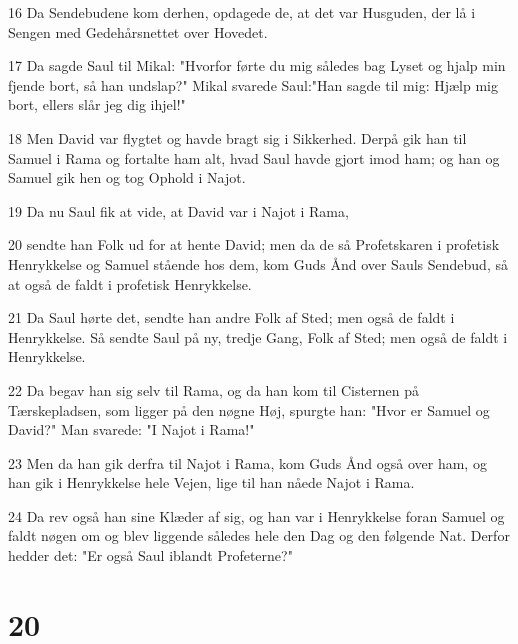\par 16 Da Sendebudene kom derhen, opdagede de, at det var Husguden, der lå i Sengen med Gedehårsnettet over Hovedet.
\par 17 Da sagde Saul til Mikal: "Hvorfor førte du mig således bag Lyset og hjalp min fjende bort, så han undslap?" Mikal svarede Saul:"Han sagde til mig: Hjælp mig bort, ellers slår jeg dig ihjel!"
\par 18 Men David var flygtet og havde bragt sig i Sikkerhed. Derpå gik han til Samuel i Rama og fortalte ham alt, hvad Saul havde gjort imod ham; og han og Samuel gik hen og tog Ophold i Najot.
\par 19 Da nu Saul fik at vide, at David var i Najot i Rama,
\par 20 sendte han Folk ud for at hente David; men da de så Profetskaren i profetisk Henrykkelse og Samuel stående hos dem, kom Guds Ånd over Sauls Sendebud, så at også de faldt i profetisk Henrykkelse.
\par 21 Da Saul hørte det, sendte han andre Folk af Sted; men også de faldt i Henrykkelse. Så sendte Saul på ny, tredje Gang, Folk af Sted; men også de faldt i Henrykkelse.
\par 22 Da begav han sig selv til Rama, og da han kom til Cisternen på Tærskepladsen, som ligger på den nøgne Høj, spurgte han: "Hvor er Samuel og David?" Man svarede: "I Najot i Rama!"
\par 23 Men da han gik derfra til Najot i Rama, kom Guds Ånd også over ham, og han gik i Henrykkelse hele Vejen, lige til han nåede Najot i Rama.
\par 24 Da rev også han sine Klæder af sig, og han var i Henrykkelse foran Samuel og faldt nøgen om og blev liggende således hele den Dag og den følgende Nat. Derfor hedder det: "Er også Saul iblandt Profeterne?"

\chapter{20}

